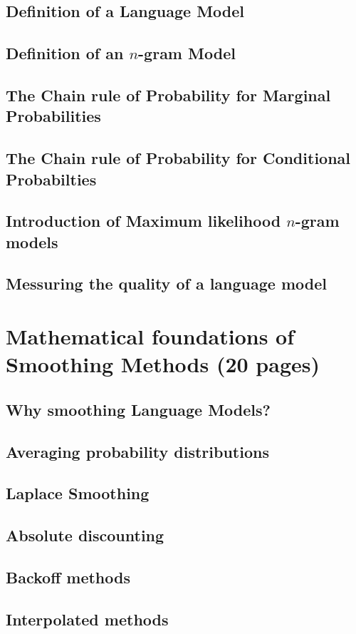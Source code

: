 \section{Definition of a Language Model}
\section{Definition of an $n$-gram Model}
\section{The Chain rule of Probability for Marginal Probabilities}
\section{The Chain rule of Probability for Conditional Probabilties}
\section{Introduction of Maximum likelihood $n$-gram models}
\section{Messuring the quality of a language model}

\chapter{Mathematical foundations of Smoothing Methods (20 pages)}
\section{Why smoothing Language Models?}
\section{Averaging probability distributions}
\section{Laplace Smoothing}
\section{Absolute discounting}
\section{Backoff methods}
\section{Interpolated methods}
